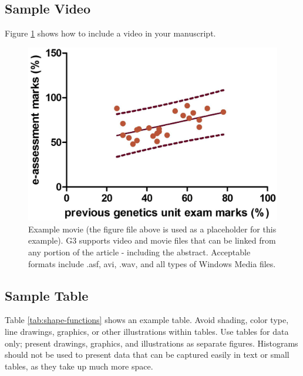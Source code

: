 \documentclass[9pt,twocolumn,twoside]{g3_article/gsag3jnl}
\begin{document}
\subsection*{Sample Video}

Figure \ref{video:spectrum} shows how to include a video in your manuscript.

\begin{figure}[htbp]
\renewcommand{\familydefault}{\sfdefault}\normalfont
\centering
\includegraphics[width=\linewidth]{images/example-figure-g3}
\caption{Example movie (the figure file above is used as a placeholder for this example). G3 supports video and movie 
         files that can be linked from any portion of the article - including the abstract. Acceptable formats include 
         .asf, avi, .wav, and all types of Windows Media files.   
}%

\label{video:spectrum}
\end{figure}


\subsection*{Sample Table}

Table \ref{tab:shape-functions} shows an example table. Avoid shading, color type, line drawings, graphics, or 
                                other illustrations within tables. Use tables for data only; present drawings, graphics, 
                                and illustrations as separate figures. Histograms should not be used to present data 
                                that can be captured easily in text or small tables, as they take up much more space.  
\end{document}
